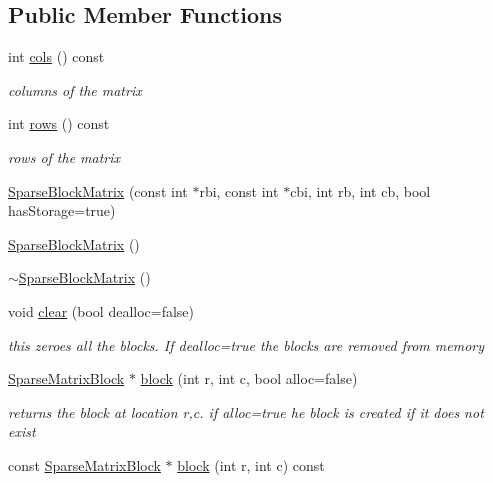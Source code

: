 \subsection*{Public Member Functions}
\begin{DoxyCompactItemize}
\item 
int \mbox{\hyperlink{classg2o_1_1_sparse_block_matrix_ac9dfcc991976a6c21dcbed961f06282d}{cols}} () const
\begin{DoxyCompactList}\small\item\em columns of the matrix \end{DoxyCompactList}\item 
int \mbox{\hyperlink{classg2o_1_1_sparse_block_matrix_aaad7b1558369203795419345ee014852}{rows}} () const
\begin{DoxyCompactList}\small\item\em rows of the matrix \end{DoxyCompactList}\item 
\mbox{\hyperlink{classg2o_1_1_sparse_block_matrix_a0407f26837522322d7b7fd7a5259ee3c}{Sparse\+Block\+Matrix}} (const int $\ast$rbi, const int $\ast$cbi, int rb, int cb, bool has\+Storage=true)
\item 
\mbox{\hyperlink{classg2o_1_1_sparse_block_matrix_af9b8a9cb09a88bc444775a9974db8760}{Sparse\+Block\+Matrix}} ()
\item 
\mbox{\hyperlink{classg2o_1_1_sparse_block_matrix_a70d18ec0265a69e1291083e20a5bc95e}{$\sim$\+Sparse\+Block\+Matrix}} ()
\item 
void \mbox{\hyperlink{classg2o_1_1_sparse_block_matrix_af14b7aaa588b339f2c06793fcc0d4e09}{clear}} (bool dealloc=false)
\begin{DoxyCompactList}\small\item\em this zeroes all the blocks. If dealloc=true the blocks are removed from memory \end{DoxyCompactList}\item 
\mbox{\hyperlink{classg2o_1_1_sparse_block_matrix_ab2f7376cbf055803fda6527dcc43e3be}{Sparse\+Matrix\+Block}} $\ast$ \mbox{\hyperlink{classg2o_1_1_sparse_block_matrix_aaca7b38d2e9a18eebf9e6f5957af0cf7}{block}} (int r, int c, bool alloc=false)
\begin{DoxyCompactList}\small\item\em returns the block at location r,c. if alloc=true he block is created if it does not exist \end{DoxyCompactList}\item 
const \mbox{\hyperlink{classg2o_1_1_sparse_block_matrix_ab2f7376cbf055803fda6527dcc43e3be}{Sparse\+Matrix\+Block}} $\ast$ \mbox{\hyperlink{classg2o_1_1_sparse_block_matrix_aa8268815dbc660a4aa04c4360e3e9e2c}{block}} (int r, int c) const

\end{DoxyCompactItemize}
